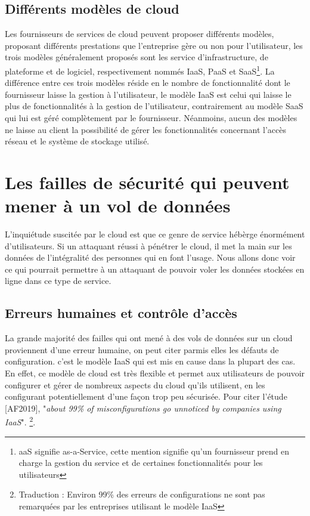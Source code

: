 \documentclass[a4paper, 12pt]{article}
\begin{document}
    \subsection{Différents modèles de cloud}
      Les fournisseurs de services de cloud peuvent proposer différents modèles,
      proposant différents prestations que l'entreprise gère ou non pour
      l'utilisateur, les trois modèles généralement proposés sont les service
      d'infrastructure, de plateforme et de logiciel, respectivement nommés
      IaaS, PaaS et SaaS\footnote{aaS signifie as-a-Service, cette mention
      signifie qu'un fournisseur prend en charge la gestion du service et de
      certaines fonctionnalités pour les utilisateurs}. La différence entre ces
      trois modèles réside en le nombre de fonctionnalité dont le fournisseur
      laisse la gestion à l'utilisateur, le modèle IaaS est celui qui laisse le
      plus de fonctionnalités à la gestion de l'utilisateur, contrairement au
      modèle SaaS qui lui est géré complètement par le fournisseur. Néanmoins,
      aucun des modèles ne laisse au client la possibilité de gérer les
      fonctionnalités concernant l'accès réseau et le système de stockage
      utilisé.

  \section{Les failles de sécurité qui peuvent mener à un vol de données}
    L'inquiétude suscitée par le cloud est que ce genre de service hébèrge
    énormément d'utilisateurs. Si un attaquant réussi à pénétrer le cloud, il
    met la main sur les données de l'intégralité des personnes qui en font
    l'usage. Nous allons donc voir ce qui pourrait permettre à un attaquant de
    pouvoir voler les données stockées en ligne dans ce type de service.

    \subsection{Erreurs humaines et contrôle d'accès}
      La grande majorité des failles qui ont mené à des vols de données sur
      un cloud proviennent d'une erreur humaine, on peut citer parmis elles les
      défauts de configuration. c'est le modèle IaaS qui est mis en cause dans
      la plupart des cas. En effet, ce modèle de cloud est très flexible et
      permet aux utilisateurs de pouvoir configurer et gérer de nombreux aspects
      du cloud qu'ils utilisent, en les configurant potentiellement d'une façon
      trop peu sécurisée. Pour citer l'étude [AF2019], "\textit{about 99\% of
      misconfigurations go unnoticed by companies using IaaS}".
      \footnote{Traduction : Environ 99\% des erreurs de configurations ne sont
      pas remarquées par les entreprises utilisant le modèle IaaS}. \\
\end{document}
